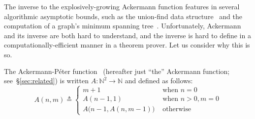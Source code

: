 The inverse to the explosively-growing Ackermann function
features in several algorithmic asymptotic
bounds, such as the union-find data structure~\cite{tarjan} and
the computation of a graph's minimum spanning
tree~\cite{chazelle}.  Unfortunately, Ackermann
and its inverse are both 
hard to understand, and the inverse is hard to define in a computationally-efficient manner in a theorem prover.  Let us consider why this
is so.
\begin{defn} \label{defn: ack}
The Ackermann-P\'eter function~\cite{peter} (hereafter just
``the'' Ackermann function; see~\S\ref{sec:related}) is
written $A : \mathbb{N}^2 \to \mathbb{N}$ and defined as follows:
\begin{equation}
\label{eq:ackermann}
A(n, m) \triangleq \begin{cases}
m + 1 & \text{ when } n = 0 \\
A(n-1, 1) & \text{ when } n > 0, m = 0 \\
A\big(n-1, A(n, m-1)\big) & \text{ otherwise}
\end{cases}
\end{equation}
\end{defn}

